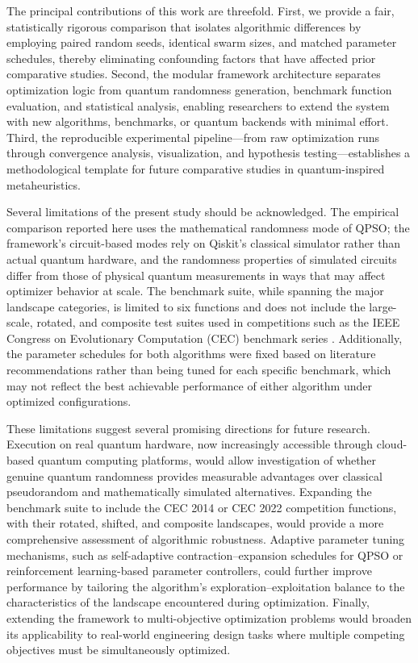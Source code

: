The principal contributions of this work are threefold. First, we provide a fair, statistically rigorous comparison that isolates algorithmic differences by employing paired random seeds, identical swarm sizes, and matched parameter schedules, thereby eliminating confounding factors that have affected prior comparative studies. Second, the modular framework architecture separates optimization logic from quantum randomness generation, benchmark function evaluation, and statistical analysis, enabling researchers to extend the system with new algorithms, benchmarks, or quantum backends with minimal effort. Third, the reproducible experimental pipeline---from raw optimization runs through convergence analysis, visualization, and hypothesis testing---establishes a methodological template for future comparative studies in quantum-inspired metaheuristics.

Several limitations of the present study should be acknowledged. The empirical comparison reported here uses the mathematical randomness mode of QPSO; the framework's circuit-based modes rely on Qiskit's classical simulator rather than actual quantum hardware, and the randomness properties of simulated circuits differ from those of physical quantum measurements in ways that may affect optimizer behavior at scale. The benchmark suite, while spanning the major landscape categories, is limited to six functions and does not include the large-scale, rotated, and composite test suites used in competitions such as the IEEE Congress on Evolutionary Computation (CEC) benchmark series \cite{Liang2013}. Additionally, the parameter schedules for both algorithms were fixed based on literature recommendations rather than being tuned for each specific benchmark, which may not reflect the best achievable performance of either algorithm under optimized configurations.

These limitations suggest several promising directions for future research. Execution on real quantum hardware, now increasingly accessible through cloud-based quantum computing platforms, would allow investigation of whether genuine quantum randomness provides measurable advantages over classical pseudorandom and mathematically simulated alternatives. Expanding the benchmark suite to include the CEC 2014 or CEC 2022 competition functions, with their rotated, shifted, and composite landscapes, would provide a more comprehensive assessment of algorithmic robustness. Adaptive parameter tuning mechanisms, such as self-adaptive contraction--expansion schedules for QPSO or reinforcement learning-based parameter controllers, could further improve performance by tailoring the algorithm's exploration--exploitation balance to the characteristics of the landscape encountered during optimization. Finally, extending the framework to multi-objective optimization problems would broaden its applicability to real-world engineering design tasks where multiple competing objectives must be simultaneously optimized.

